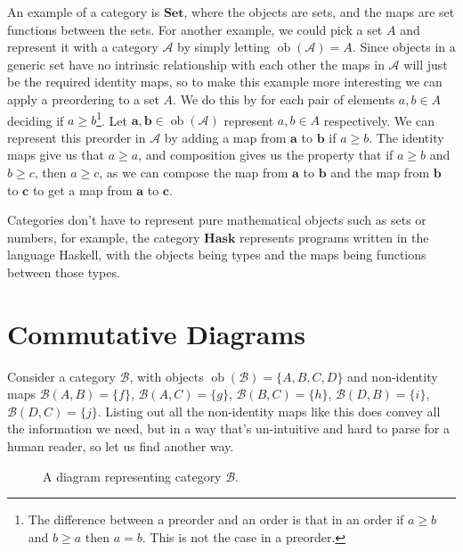 \documentclass[logo,bsc,singlespacing,parskip]{infthesis}
\theoremstyle{definition}
\newcommand{\cat}[1]{\mathscr{#1}}
\newcommand{\ob}[1]{\obj(\mathscr{#1})}
\DeclareMathOperator{\obj}{ob}
\begin{document}
An example of a category is $\mathbf{Set}$, where the objects are sets, and the maps are set functions between the sets. For another example, we could pick a set $A$ and represent it with a category $\cat{A}$ by simply letting $\ob{A} = A$. Since objects in a generic set have no intrinsic relationship with each other the maps in $\cat{A}$ will just be the required identity maps, so to make this example more interesting we can apply a preordering to a set $A$. We do this by for each pair of elements $a,b \in A$ deciding if $a \ge b$\footnote{The difference between a preorder and an order is that in an order if $a \ge b$ and $b \ge a$ then $a = b$. This is not the case in a preorder.}. Let $\mathbf{a}, \mathbf{b} \in \ob{A}$ represent $a,b \in A$ respectively. We can represent this preorder in $\cat A$ by adding a map from $\mathbf{a}$ to $\mathbf{b}$ if $a \ge b$. The identity maps give us that $a \ge a$, and composition gives us the property that if $a \ge b$ and $b \ge c$, then $a \ge c$, as we can compose the map from $\mathbf{a}$ to $\mathbf{b}$ and the map from $\mathbf{b}$ to $\mathbf{c}$ to get a map from $\mathbf{a}$ to $\mathbf{c}$. 

Categories don't have to represent pure mathematical objects such as sets or numbers, for example, the category $\mathbf{Hask}$ \cite{wiki:hask} represents programs written in the language Haskell, with the objects being types and the maps being functions between those types. 

\section{Commutative Diagrams}\label{bkg:diag}
Consider a category $\cat B$, with objects $\ob{B} = \{A,B,C,D\}$ and non-identity maps $\cat{B}(A,B) = \{f\}$, $\cat{B}(A,C) = \{g\}$, $\cat{B}(B,C) = \{h\}$, $\cat{B}(D,B) = \{i\}$, $\cat{B}(D,C) = \{j\}$. Listing out all the non-identity maps like this does convey all the information we need, but in a way that's un-intuitive and hard to parse for a human reader, so let us find another way. 

\begin{figure}[h]
    \centering
    \caption{A diagram representing category $\cat B$.}
    \label{fig:comm-diag-ex1}
\end{figure}
\end{document}
